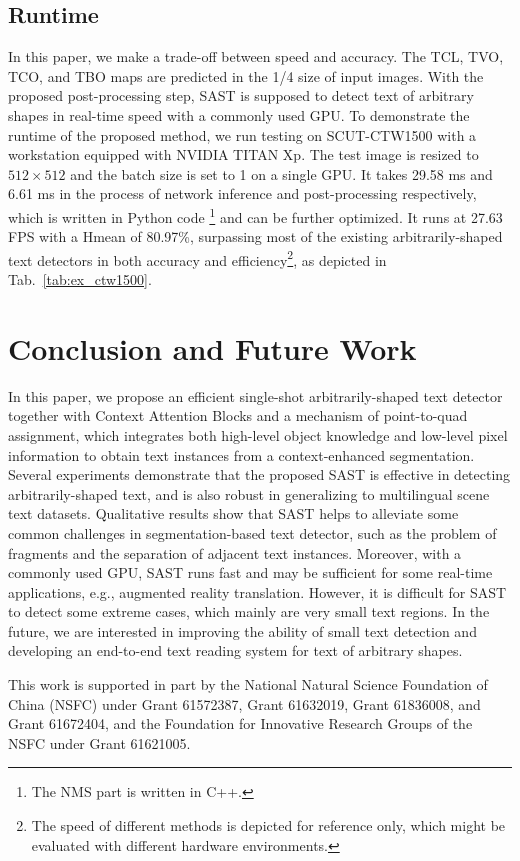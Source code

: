 \documentclass[sigconf]{acmart}
\begin{document}
\subsection{Runtime}
In this paper, we make a trade-off between speed and accuracy. The TCL, TVO, TCO, and TBO maps are predicted in the 1/4 size of input images. With the proposed post-processing step, SAST is supposed to detect text of arbitrary shapes in real-time speed with a commonly used GPU. To demonstrate the runtime of the proposed method, we run testing on SCUT-CTW1500 with a workstation equipped with NVIDIA TITAN Xp. The test image is resized to $512 \times 512$ and the batch size is set to 1 on a single GPU. It takes 29.58 ms and 6.61 ms in the process of network inference and post-processing respectively, which is written in Python code \footnote{The NMS part is written in C++.} and can be further optimized. It runs at 27.63 FPS with a Hmean of 80.97\%, surpassing most of the existing arbitrarily-shaped text detectors in both accuracy and efficiency\footnote{The speed of different methods is depicted for reference only, which might be evaluated with different hardware environments.}, as depicted in Tab.~\ref{tab:ex_ctw1500}. 








\section{Conclusion and Future Work}
In this paper, we propose an efficient single-shot arbitrarily-shaped text detector together with Context Attention Blocks and a mechanism of point-to-quad assignment, which integrates both high-level object knowledge and low-level pixel information to obtain text instances from a context-enhanced segmentation. Several experiments demonstrate that the proposed SAST is effective in detecting arbitrarily-shaped text, and is also robust in generalizing to multilingual scene text datasets. Qualitative results show that SAST helps to alleviate some common challenges in segmentation-based text detector, such as the problem of fragments and the separation of adjacent text instances. Moreover, with a commonly used GPU, SAST runs fast and may be sufficient for some real-time applications, e.g., augmented reality translation. However, it is difficult for SAST to detect some extreme cases, which mainly are very small text regions. In the future, we are interested in improving the ability of small text detection and developing an end-to-end text reading system for text of arbitrary shapes.



\begin{acks}
  This work is supported in part by the National Natural Science Foundation of
  China (NSFC) under Grant 61572387, Grant 61632019, Grant 61836008,
  and Grant 61672404, and the Foundation for Innovative Research
  Groups of the NSFC under Grant 61621005.
\end{acks}



\end{document}
